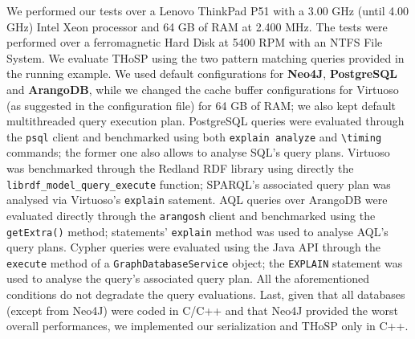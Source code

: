 We performed our tests over a Lenovo ThinkPad P51 with a 3.00 GHz (until 4.00 GHz) Intel Xeon processor and 64 GB of RAM at 2.400 MHz. The tests were performed over a ferromagnetic Hard Disk at 5400 RPM with an NTFS File System. We evaluate THoSP using the two pattern matching queries provided in the running example. 
We used default configurations for  \textbf{Neo4J}, \textbf{PostgreSQL} and \textbf{ArangoDB}, while we changed the cache buffer configurations for Virtuoso (as suggested in the configuration file) for 64 GB of RAM; we also kept  default multithreaded query execution plan. PostgreSQL queries were evaluated through the \texttt{psql} client and benchmarked using both \texttt{explain analyze} and \texttt{\textbackslash timing} commands; the former one also allows to analyse SQL's query plans. Virtuoso was benchmarked through the Redland RDF library using directly the \texttt{librdf\_model\_query\_execute} function; SPARQL's associated query plan was analysed via Virtuoso's \texttt{explain} satement. 
AQL queries over {ArangoDB} were evaluated directly through the \texttt{arangosh} client and benchmarked using the \texttt{getExtra()} method; statements' \texttt{explain} method was used to analyse AQL's query plans. %
Cypher queries were evaluated using the Java API through the \texttt{execute} method of a \texttt{GraphDatabaseService} object; the \texttt{EXPLAIN} statement was used to analyse the query's associated query plan.
All the aforementioned conditions do not degradate the query evaluations. Last, given that all databases (except from Neo4J) were coded in C/C++ and that Neo4J provided the worst overall performances, we implemented our serialization and THoSP only in C++.




